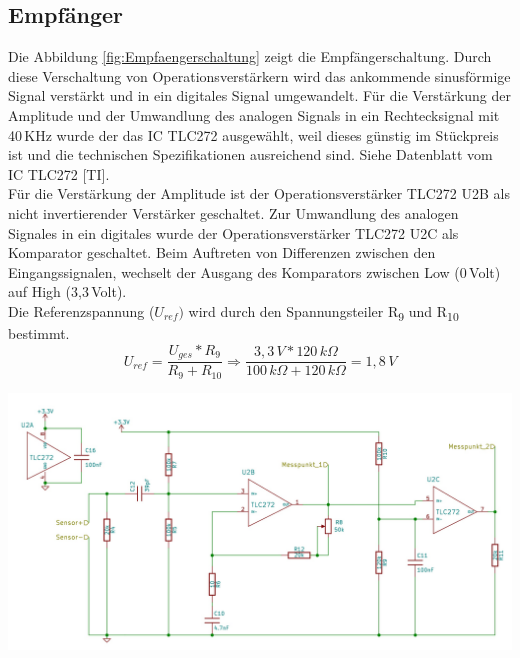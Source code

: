 \subsection{Empfänger}
Die Abbildung \ref{fig:Empfaengerschaltung} zeigt die Empfängerschaltung. Durch diese Verschaltung von Operationsverstärkern wird das ankommende sinusförmige Signal verstärkt und in ein digitales Signal umgewandelt. Für die Verstärkung der Amplitude und der Umwandlung des analogen Signals in ein Rechtecksignal mit 40\,KHz wurde der das IC TLC272 ausgewählt, weil dieses günstig im Stückpreis ist und die technischen Spezifikationen ausreichend sind. Siehe Datenblatt vom IC TLC272 [TI].\\
Für die Verstärkung der Amplitude ist der Operationsverstärker TLC272 U2B als nicht invertierender Verstärker geschaltet.
Zur Umwandlung des analogen Signales in ein digitales wurde der Operationsverstärker TLC272 U2C als Komparator geschaltet. Beim Auftreten von Differenzen zwischen den Eingangssignalen, wechselt der Ausgang des Komparators zwischen Low (0\,Volt) auf High (3,3\,Volt).\\ Die Referenzspannung (\(\displaystyle U_{ref})\)  wird durch den Spannungsteiler R\textsubscript{9} und R\textsubscript{10} bestimmt.
\onehalfspacing \\
\[\displaystyle U_{ref}=\frac{U_{ges}*R_{9}}{R_{9}+R_{10}}\Rightarrow\frac{3,3\,V*120\,k\Omega}{100\,k\Omega+120\,k\Omega}=1,8\,V \]
\singlespacing
\begin{center}
\begin{minipage}{1\textwidth}
\includegraphics[width=1\textwidth%
]{Abbildungen/Empfaenger.png}
\label{fig:Empfaengerschaltung}
\end{minipage}\\
\end{center}

